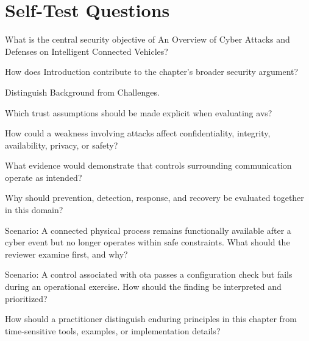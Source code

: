 \documentclass[11pt,letterpaper]{article}
\begin{document}
\section*{Self-Test Questions}
\begin{CornellRecallList}
\item What is the central security objective of An Overview of Cyber Attacks and Defenses on Intelligent Connected Vehicles?
\item How does Introduction contribute to the chapter's broader security argument?
\item Distinguish Background from Challenges.
\item Which trust assumptions should be made explicit when evaluating avs?
\item How could a weakness involving attacks affect confidentiality, integrity, availability, privacy, or safety?
\item What evidence would demonstrate that controls surrounding communication operate as intended?
\item Why should prevention, detection, response, and recovery be evaluated together in this domain?
\item Scenario: A connected physical process remains functionally available after a cyber event but no longer operates within safe constraints. What should the reviewer examine first, and why?
\item Scenario: A control associated with ota passes a configuration check but fails during an operational exercise. How should the finding be interpreted and prioritized?
\item How should a practitioner distinguish enduring principles in this chapter from time-sensitive tools, examples, or implementation details?
\end{CornellRecallList}
\end{document}
